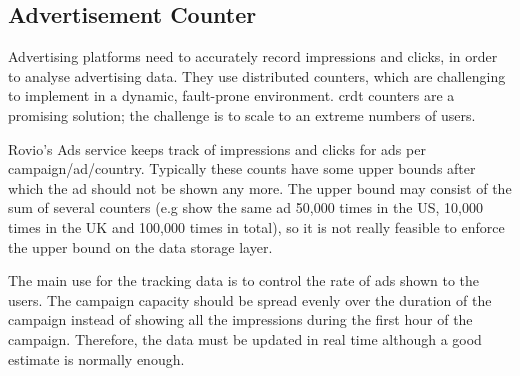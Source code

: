 \subsection{Advertisement Counter}
Advertising platforms need to accurately record impressions and clicks, in order to analyse advertising data. They use distributed counters, which are challenging to implement in a dynamic, fault-prone environment. \gls{crdt} counters are a promising solution; the challenge is to scale to an extreme numbers of users.

Rovio's Ads service keeps track of impressions and clicks for ads per campaign/ad/country. Typically these counts have some upper bounds after which the ad should not be shown any more. The upper bound may consist of the sum of several counters (e.g show the same ad 50,000 times in the US, 10,000 times in the UK and 100,000 times in total), so it is not really feasible to enforce the upper bound on the data storage layer.

The main use for the tracking data is to control the rate of ads shown to the users. The campaign capacity should be spread evenly over the duration of the campaign instead of showing all the impressions during the first hour of the campaign. Therefore, the data must be updated in real time although a good estimate is normally enough. 


